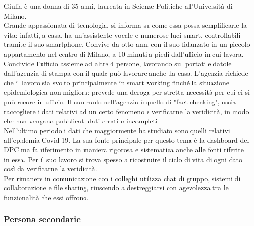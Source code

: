 Giulia è una donna di 35 anni, laureata in Scienze Politiche all'Università di Milano.\\ 
Grande appassionata di tecnologia, si informa su come essa possa semplificarle la vita: infatti, a casa, ha un'assistente vocale e numerose luci smart, controllabili tramite il suo smartphone.
Convive da otto anni con il suo fidanzato in un piccolo appartamento nel centro di Milano, a 10 minuti a piedi dall'ufficio in cui lavora. Condivide l'ufficio assieme ad altre 4 persone, lavorando sul portatile datole dall'agenzia di stampa con il quale può lavorare anche da casa. L'agenzia richiede che il lavoro sia svolto principalmente in smart working finché la situazione epidemiologica non migliora: prevede una deroga per stretta necessità per cui ci si può recare in ufficio.
Il suo ruolo nell'agenzia è quello di "fact-checking", ossia raccogliere i dati relativi ad un certo fenomeno e verificarne la veridicità, in modo che non vengano pubblicati dati errati o incompleti.\\ 
Nell'ultimo periodo i dati che maggiormente ha studiato sono quelli relativi all'epidemia Covid-19. La sua fonte principale per questo tema è la dashboard del DPC ma fa riferimento in maniera rigorosa e sistematica anche alle fonti riferite in essa. Per il suo lavoro si trova spesso a ricostruire il ciclo di vita di ogni dato così da verificarne la veridicità.\\ 
Per rimanere in comunicazione con i colleghi utilizza chat di gruppo, sistemi di collaborazione e file sharing, riuscendo a destreggiarsi con agevolezza tra le funzionalità che essi offrono. 

\subsubsection{Persona secondarie}
